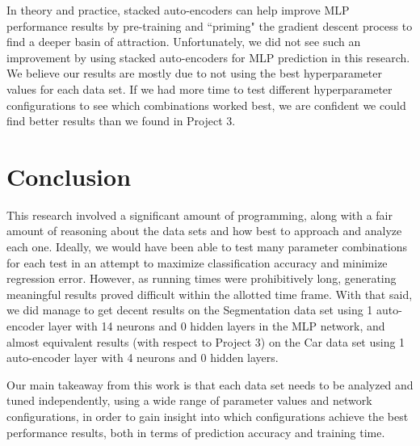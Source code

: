 \documentclass[twoside,11pt]{article}
\begin{document}
In theory and practice, stacked auto-encoders can help improve MLP performance results by pre-training and ``priming" the gradient descent process to find a deeper basin of attraction. Unfortunately, we did not see such an improvement by using stacked auto-encoders for MLP prediction in this research. We believe our results are mostly due to not using the best hyperparameter values for each data set. If we had more time to test different hyperparameter configurations to see which combinations worked best, we are confident we could find better results than we found in Project 3.

\section{Conclusion}

This research involved a significant amount of programming, along with a fair amount of reasoning about the data sets and how best to approach and analyze each one. Ideally, we would have been able to test many parameter combinations for each test in an attempt to maximize classification accuracy and minimize regression error. However, as running times were prohibitively long, generating meaningful results proved difficult within the allotted time frame. With that said, we did manage to get decent results on the Segmentation data set using 1 auto-encoder layer with 14 neurons and 0 hidden layers in the MLP network, and almost equivalent results (with respect to Project 3) on the Car data set using 1 auto-encoder layer with 4 neurons and 0 hidden layers. 

Our main takeaway from this work is that each data set needs to be analyzed and tuned independently, using a wide range of parameter values and network configurations, in order to gain insight into which configurations achieve the best performance results, both in terms of prediction accuracy and training time.



\end{document}
